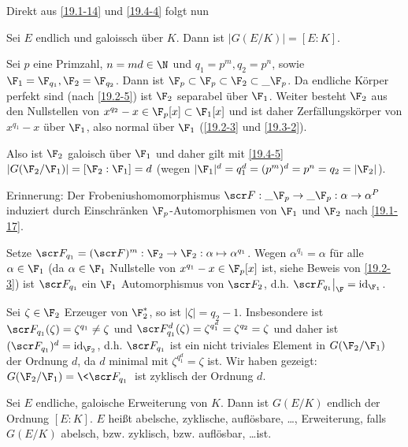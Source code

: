 Direkt aus \ref{19.1-14} und \ref{19.4-4} folgt nun

\begin{kor} \label{19.4-5}
	Sei $E$ endlich und galoissch über $K$.
	Dann ist $|G(E/K)| = [E:K]$.
\end{kor}

\begin{ex} \label{19.4-6}
	Sei $p$ eine Primzahl, $n = md \in \N$ und $q_1 = p^m, q_2 = p^n$, sowie $\F_1 = \F_{q_1}, \F_2 = \F_{q_2}$.
	Dann ist $\F_p \subset \F_p \subset \F_2 \subset \_{\F_p}$.
	Da endliche Körper perfekt sind (nach \ref{19.2-5}) ist $\F_2$ separabel über $\F_1$.
	Weiter besteht $\F_2$ aus den Nullstellen von $x^{q_2} - x \in \F_p[x] \subset \F_1[x]$ und ist daher Zerfällungskörper von $x^{q_1} - x$ über $\F_1$, also normal über $\F_1$ (\ref{19.2-3} und \ref{19.3-2}).

	Also ist $\F_2$ galoisch über $\F_1$ und daher gilt mit \ref{19.4-5} $|G(\F_2 / \F_1)| = [\F_2 : \F_1] = d$ (wegen $|\F_1|^d = q_1^d = (p^m)^d = p^n = q_2 = |\F_2|$).

	Erinnerung:
	Der Frobeniushomomorphismus $\scr F: \_{\F_p} \to \_{\F_p}: \alpha \to \alpha^P$ induziert durch Einschränken $\F_p$-Automorphismen von $\F_1$ und $\F_2$ nach \ref{19.1-17}.

	Setze $\scr F_{q_1} = (\scr F)^m: \F_2 \to \F_2: \alpha \mapsto \alpha^{q_1}$.
	Wegen $\alpha^{q_1} = \alpha$ für alle $\alpha \in \F_1$ (da $\alpha \in \F_1$ Nullstelle von $x^{q_1} - x \in \F_p[x]$ ist, siehe Beweis von \ref{19.2-3}) ist $\scr F_{q_1}$ ein $\F_1$ Automorphismus von $\scr F_2$, d.h. $\scr F_{q_1}\big|_{\F} = \id_{\F_1}$.

	Sei $\zeta \in \F_2$ Erzeuger von $\F_2^*$, so ist $|\zeta| = q_2 - 1$.
	Insbesondere ist $\scr F_{q_1}(\zeta) = \zeta^{q_1} \neq \zeta$ und $\scr F_{q_1}^d(\zeta) = \zeta^{q_1^{d}} = \zeta^{q_2} = \zeta$ und daher ist $(\scr F_{q_1})^d = \id_{\F_2}$, d.h. $\scr F_{q_1}$ ist ein nicht triviales Element in $G(\F_2 / \F_1)$ der Ordnung $d$, da $d$ minimal mit $\zeta^{q_1^{d}} = \zeta$ ist.
	Wir haben gezeigt: $G(\F_2 / \F_1) = \< \scr F_{q_1} \>$ ist zyklisch der Ordnung $d$.
\end{ex}

\begin{conv} \label{19.4-7}
	Sei $E$ endliche, galoische Erweiterung von $K$.
	Dann ist $G(E / K)$ endlich der Ordnung $[E: K]$.
	$E$ heißt abelsche, zyklische, auflösbare, \dots, Erweiterung, falls $G(E / K)$ abelsch, bzw. zyklisch, bzw. auflösbar, \dots ist.
\end{conv}

